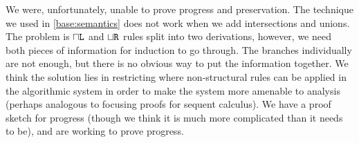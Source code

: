 
We were, unfortunately, unable to prove progress and preservation. The technique we used in \cref{base:semantics} does not work when we add intersections and unions. The problem is $\mathbin{\sqcap}\texttt{L}$ and $\mathbin{\sqcup}\texttt{R}$ rules split into two derivations, however, we need both pieces of information for induction to go through. The branches individually are not enough, but there is no obvious way to put the information together. We think the solution lies in restricting where non-structural rules can be applied in the algorithmic system in order to make the system more amenable to analysis (perhaps analogous to focusing proofs for sequent calculus). We have a proof sketch for progress (though we think it is much more complicated than it needs to be), and are working to prove progress.

